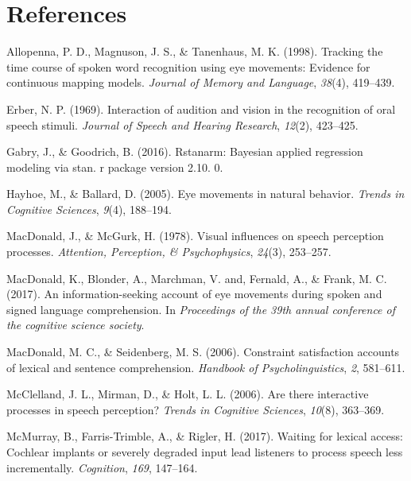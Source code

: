 \documentclass[10pt, letterpaper]{article}
\begin{document}
\section{References}\label{references}

\setlength{\parindent}{-0.1in} \setlength{\leftskip}{0.125in} \noindent

\hypertarget{refs}{}
\hypertarget{ref-allopenna1998tracking}{}
Allopenna, P. D., Magnuson, J. S., \& Tanenhaus, M. K. (1998). Tracking
the time course of spoken word recognition using eye movements: Evidence
for continuous mapping models. \emph{Journal of Memory and Language},
\emph{38}(4), 419--439.

\hypertarget{ref-erber1969interaction}{}
Erber, N. P. (1969). Interaction of audition and vision in the
recognition of oral speech stimuli. \emph{Journal of Speech and Hearing
Research}, \emph{12}(2), 423--425.

\hypertarget{ref-gabry2016rstanarm}{}
Gabry, J., \& Goodrich, B. (2016). Rstanarm: Bayesian applied regression
modeling via stan. r package version 2.10. 0.

\hypertarget{ref-hayhoe2005eye}{}
Hayhoe, M., \& Ballard, D. (2005). Eye movements in natural behavior.
\emph{Trends in Cognitive Sciences}, \emph{9}(4), 188--194.

\hypertarget{ref-macdonald1978visual}{}
MacDonald, J., \& McGurk, H. (1978). Visual influences on speech
perception processes. \emph{Attention, Perception, \& Psychophysics},
\emph{24}(3), 253--257.

\hypertarget{ref-macdonald2017info}{}
MacDonald, K., Blonder, A., Marchman, V. and, Fernald, A., \& Frank, M.
C. (2017). An information-seeking account of eye movements during spoken
and signed language comprehension. In \emph{Proceedings of the 39th
annual conference of the cognitive science society}.

\hypertarget{ref-macdonald2006constraint}{}
MacDonald, M. C., \& Seidenberg, M. S. (2006). Constraint satisfaction
accounts of lexical and sentence comprehension. \emph{Handbook of
Psycholinguistics}, \emph{2}, 581--611.

\hypertarget{ref-mcclelland2006there}{}
McClelland, J. L., Mirman, D., \& Holt, L. L. (2006). Are there
interactive processes in speech perception? \emph{Trends in Cognitive
Sciences}, \emph{10}(8), 363--369.

\hypertarget{ref-mcmurray2017waiting}{}
McMurray, B., Farris-Trimble, A., \& Rigler, H. (2017). Waiting for
lexical access: Cochlear implants or severely degraded input lead
listeners to process speech less incrementally. \emph{Cognition},
\emph{169}, 147--164.
\end{document}
